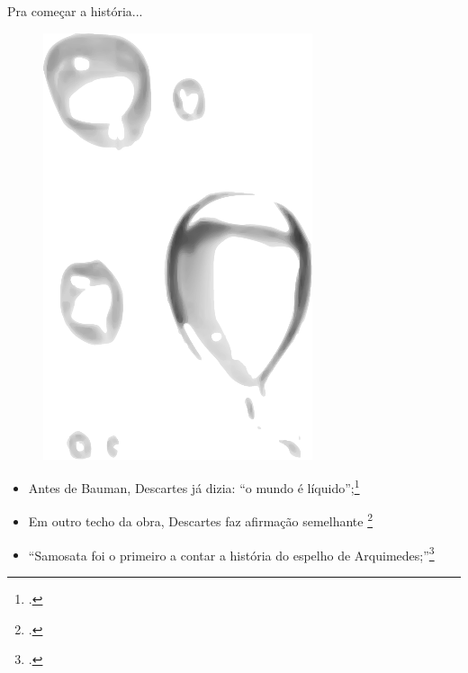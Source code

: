 \documentclass[aspectratio=169]{beamer}
\begin{document}
\begin{frame}{Pra começar a história...}
\begin{minipage}{0.4\textwidth}
	\begin{figure}
		\centering
		\includegraphics[scale=0.2]{figuras/gota-dagua.pdf}
	\end{figure}
\end{minipage}
\begin{itemize}
	\item Antes de Bauman, Descartes já dizia: ``o mundo é líquido'';\footcite{descartes-metodo}
	\item Em outro techo da obra, Descartes faz afirmação semelhante \footcite[O que pode ser visto no segundo capítulo. Ver, por exemplo,][p.~56]{descartes-metodo}
	\item ``Samosata foi o primeiro a contar a história do espelho de Arquimedes;''\footcite{luciano-de-samosata}
\end{itemize}
\end{frame}


\end{document}
